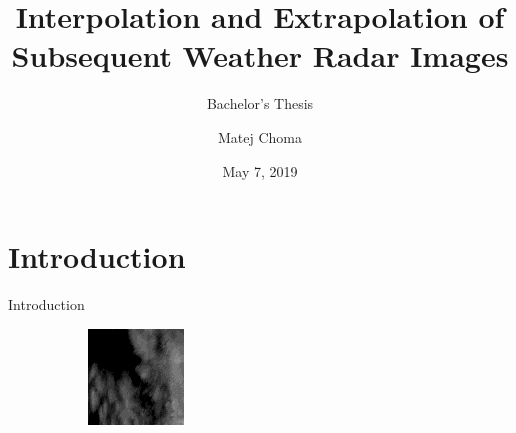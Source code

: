 \documentclass{beamer}
\title[BP_Choma_Matej_2019]{Interpolation and Extrapolation of Subsequent Weather Radar Images}
\subtitle{Bachelor's Thesis}
\author{Matej Choma}
\institute{Department of Applied Mathematics}
\date{May 7, 2019}
\begin{document}
\begin{frame}
  \titlepage
\end{frame}


\section{Introduction}

\begin{frame}{Introduction}
	\begin{figure}
	    \begin{subfigure}{.3\textwidth}
	        \centering
	        \includegraphics[width=\linewidth]{fig/radarcs1801030500.png}
	    \end{subfigure}
	    \begin{subfigure}{.3\textwidth}
	        \centering

\end{subfigure}
\end{figure}
\end{frame}
\end{document}
